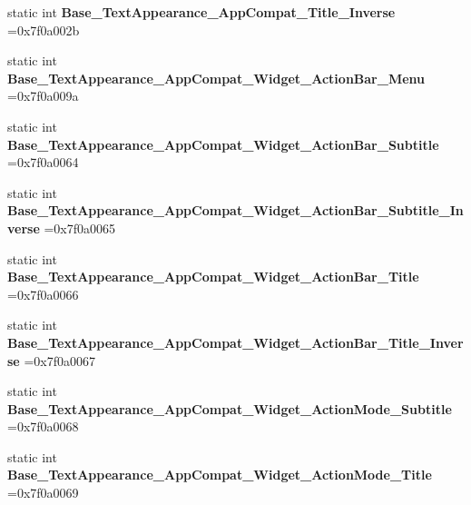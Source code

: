 \begin{DoxyCompactItemize}
static int {\bfseries Base\+\_\+\+Text\+Appearance\+\_\+\+App\+Compat\+\_\+\+Title\+\_\+\+Inverse} =0x7f0a002b
\item 
\mbox{\label{classandroid_1_1support_1_1v4_1_1R_1_1style_abcac0d9a1af2ee93a2ef43d275a5b658}} 
static int {\bfseries Base\+\_\+\+Text\+Appearance\+\_\+\+App\+Compat\+\_\+\+Widget\+\_\+\+Action\+Bar\+\_\+\+Menu} =0x7f0a009a
\item 
\mbox{\label{classandroid_1_1support_1_1v4_1_1R_1_1style_ae7ab44244f579e40491666005fb1eb0b}} 
static int {\bfseries Base\+\_\+\+Text\+Appearance\+\_\+\+App\+Compat\+\_\+\+Widget\+\_\+\+Action\+Bar\+\_\+\+Subtitle} =0x7f0a0064
\item 
\mbox{\label{classandroid_1_1support_1_1v4_1_1R_1_1style_a494553dc6e4580c18e1fd0ff038bfe44}} 
static int {\bfseries Base\+\_\+\+Text\+Appearance\+\_\+\+App\+Compat\+\_\+\+Widget\+\_\+\+Action\+Bar\+\_\+\+Subtitle\+\_\+\+Inverse} =0x7f0a0065
\item 
\mbox{\label{classandroid_1_1support_1_1v4_1_1R_1_1style_a88582a6f7f65b334824e0906abf1e002}} 
static int {\bfseries Base\+\_\+\+Text\+Appearance\+\_\+\+App\+Compat\+\_\+\+Widget\+\_\+\+Action\+Bar\+\_\+\+Title} =0x7f0a0066
\item 
\mbox{\label{classandroid_1_1support_1_1v4_1_1R_1_1style_adc91dffdfb61eca64f143d4e92c407a0}} 
static int {\bfseries Base\+\_\+\+Text\+Appearance\+\_\+\+App\+Compat\+\_\+\+Widget\+\_\+\+Action\+Bar\+\_\+\+Title\+\_\+\+Inverse} =0x7f0a0067
\item 
\mbox{\label{classandroid_1_1support_1_1v4_1_1R_1_1style_ac51fc84e24934d5ee3102b1ebf46183f}} 
static int {\bfseries Base\+\_\+\+Text\+Appearance\+\_\+\+App\+Compat\+\_\+\+Widget\+\_\+\+Action\+Mode\+\_\+\+Subtitle} =0x7f0a0068
\item 
\mbox{\label{classandroid_1_1support_1_1v4_1_1R_1_1style_a6af6abae29274b629bab931701fb36bb}} 
static int {\bfseries Base\+\_\+\+Text\+Appearance\+\_\+\+App\+Compat\+\_\+\+Widget\+\_\+\+Action\+Mode\+\_\+\+Title} =0x7f0a0069

\end{DoxyCompactItemize}

